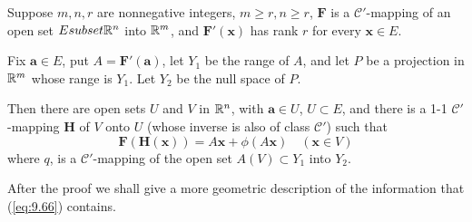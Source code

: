 \begin{thm}
    \label{thm:9.32}
    Suppose $m, n, r$ are nonnegative integers, $m \geq r, n \geq r$, 
    $\mathbf{F}$ is a $\mathscr{C}'$-mapping of an open set $E subset {\protect\mathbb R}^n$ into ${\protect\mathbb R}^m$, 
    and $\mathbf{F'(x)}$ has rank $r$ for every $\mathbf{x} \in E$.

    Fix $\mathbf{a} \in E$, put $A = \mathbf{F'(a)}$, 
    let $Y_1$ be the range of $A$, 
    and let $P$ be a projection in ${\protect\mathbb R}^m$ whose range is $Y_1$. 
    Let $Y_2$ be the null space of $P$.

    Then there are open sets $U$ and $V$ in ${\protect\mathbb R}^n$, 
    with $\mathbf{a} \in U$, $U \subset E$, 
    and there is a 1-1 $\mathscr{C'}$-mapping $\mathbf{H}$ of $V$ onto $U$ 
    (whose inverse is also of class $\mathscr{C'}$) such that
    \begin{equation}
        \label{eq:9.66}
        \mathbf{F(H(x))} = A\mathbf{x} + \phi(A\mathbf{x})
        \quad 
        (\mathbf{x} \in V)
    \end{equation}
    where $q$, is a $\mathscr{C'}$-mapping of the open set $A(V) \subset Y_1$ into $Y_2$.
\end{thm}

After the proof we shall give a more geometric description of the information that (\ref{eq:9.66}) contains.


